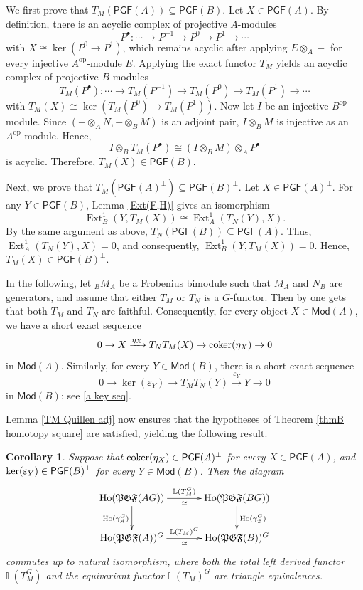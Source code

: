 \documentclass[12pt,twoside]{amsart}
\theoremstyle{bfupright head,slanted body}
\theoremstyle{bfupright head,upright body}
\theoremstyle{fixed bf head,slanted body}
\newtheorem{cor}[res]{Corollary}        \newtheorem*{cor*}{Corollary}
\theoremstyle{fixed bf head,upright body}
\theoremstyle{numbered paragraph}
\newenvironment{prf*}[1][Proof]{%
  \begin{proof}[\bf #1]
    \setcounter{equation}{0}
    \renewcommand{\theequation}{\arabic{equation}}}
  {\end{proof}
}
\newcommand{\thmcite}[2][?]{\cite[Theorem~#1]{#2}}
\numberwithin{equation}{res}
\newcommand{\coker}{\mbox{\rm coker}}
\newcommand{\calA}{\mathcal{A}}
\newcommand{\calB}{\mathcal{B}}
\newcommand{\PGF}{\mathsf{PGF}}
\newcommand{\Mod}{\mathsf{Mod}}
\newcommand{\Ho}{\mathrm{Ho}}
\newcommand{\cok}{\mbox{\rm coker}}
\newcommand{\kernel}{\mbox{\rm ker}}
\newcommand{\Ext}{\operatorname{Ext}}
\begin{document}
\begin{prf*}
We first prove that \(T_M(\PGF(A))\subseteq\PGF(B)\). Let \(X\in\PGF(A)\). By definition, there is an acyclic complex of projective \(A\)-modules
\[
P^\bullet:\cdots\to P^{-1}\to P^0\to P^1\to\cdots
\]
with \(X\cong \ker(P^0\to P^1)\), which remains acyclic after applying \(E\otimes_A-\) for every injective \(A^{\mathrm{op}}\)-module \(E\). Applying the exact functor \(T_M\) yields an acyclic complex of projective \(B\)-modules
\[
T_M(P^\bullet):\cdots\to T_M(P^{-1})\to T_M(P^0)\to T_M(P^1)\to\cdots
\]
with \(T_M(X)\cong \ker(T_M(P^0)\to T_M(P^1))\).
Now let \(I\) be an injective \(B^{\mathrm{op}}\)-module. Since \((-\otimes_A N,-\otimes_B M)\) is an adjoint pair, \(I\otimes_B M\) is injective as an \(A^{\mathrm{op}}\)-module. Hence,
\[
I\otimes_B T_M(P^\bullet)\cong (I\otimes_B M)\otimes_A P^\bullet
\]
is acyclic. Therefore, \(T_M(X)\in\PGF(B)\).

Next, we prove that \(T_M(\PGF(A)^\perp)\subseteq\PGF(B)^\perp\). Let \(X\in\PGF(A)^\perp\). For any \(Y\in\PGF(B)\), Lemma \ref{Ext(F,H)} gives an isomorphism
\[
\Ext_B^1(Y,T_M(X))\cong \Ext_A^1(T_N(Y),X).
\]
By the same argument as above, \(T_N(\PGF(B))\subseteq\PGF(A)\). Thus, \(\Ext_A^1(T_N(Y),X)=0\), and consequently, \(\Ext_B^1(Y,T_M(X))=0\). Hence, \(T_M(X)\in\PGF(B)^\perp\).
\end{prf*}

In the following, let \({}_BM_A\) be a Frobenius bimodule such that \(M_A\) and \(N_B\) are generators, and assume that either \(T_M\) or \(T_N\) is a \(G\)-functor.
Then by \thmcite[2.2]{2020HLGZ} one gets that both \(T_M\) and \(T_N\) are faithful.
Consequently, for every object \(X\in\Mod(A)\), we have a short exact sequence
\[
0 \to X \xrightarrow{\eta_X} T_N T_M(X) \to \coker(\eta_X) \to 0
\]
in \(\Mod(A)\). Similarly, for every \(Y\in\Mod(B)\), there is a short exact sequence
\[
0 \to \ker(\varepsilon_Y) \to T_M T_N(Y) \xrightarrow{\varepsilon_Y} Y \to 0
\]
in \(\Mod(B)\); see \ref{a key seq}.

Lemma \ref{TM Quillen adj} now ensures that the hypotheses of Theorem \ref{thmB homotopy square} are satisfied, yielding the following result.


\begin{cor} \label{homotopy square for F-bimodules}
Suppose that $\cok(\eta_X) \in \PGF(A)^\bot$ for every $X \in \PGF(A)$, and $\kernel(\varepsilon_Y) \in \PGF(B)^\bot$ for every $Y \in \Mod(B)$.
Then the diagram
\[
\xymatrix@C=1.2CM{
   \Ho(\mathfrak{PGF}(AG))   \ar[d]_{\Ho(\gamma_\calA^G)}^{ }  \ar[r]^{\mathbb{L}(T_M^G)}_{\simeq}
&  \Ho(\mathfrak{PGF}(BG))   \ar[d]^{\Ho(\gamma_\calB^G)}_{ }             \\
   \Ho(\mathfrak{PGF}(A))^G                              \ar[r]^{\mathbb{L}(T_M)^G}_{\simeq}
&  \Ho(\mathfrak{PGF}(B))^G                                          }
\]
commutes up to natural isomorphism, where both the total left derived functor $\mathbb{L}(T_M^G)$ and the equivariant functor $\mathbb{L}(T_M)^G$ are triangle equivalences.
\end{cor}
\end{document}
